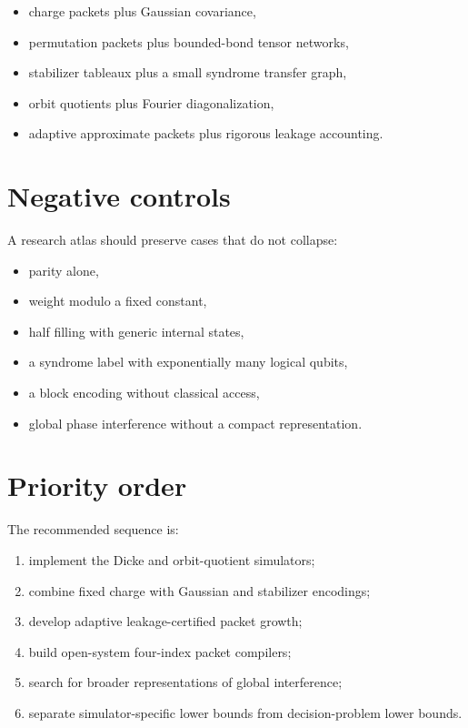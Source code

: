 \begin{itemize}
\item charge packets plus Gaussian covariance,
\item permutation packets plus bounded-bond tensor networks,
\item stabilizer tableaux plus a small syndrome transfer graph,
\item orbit quotients plus Fourier diagonalization,
\item adaptive approximate packets plus rigorous leakage accounting.
\end{itemize}

\section{Negative controls}
A research atlas should preserve cases that do not collapse:

\begin{itemize}
\item parity alone,
\item weight modulo a fixed constant,
\item half filling with generic internal states,
\item a syndrome label with exponentially many logical qubits,
\item a block encoding without classical access,
\item global phase interference without a compact representation.
\end{itemize}

\section{Priority order}
The recommended sequence is:

{\small
\begin{enumerate}[nosep,leftmargin=*,label=\arabic*.]
\item implement the Dicke and orbit-quotient simulators;
\item combine fixed charge with Gaussian and stabilizer encodings;
\item develop adaptive leakage-certified packet growth;
\item build open-system four-index packet compilers;
\item search for broader representations of global interference;
\item separate simulator-specific lower bounds from decision-problem lower bounds.
\end{enumerate}
}
